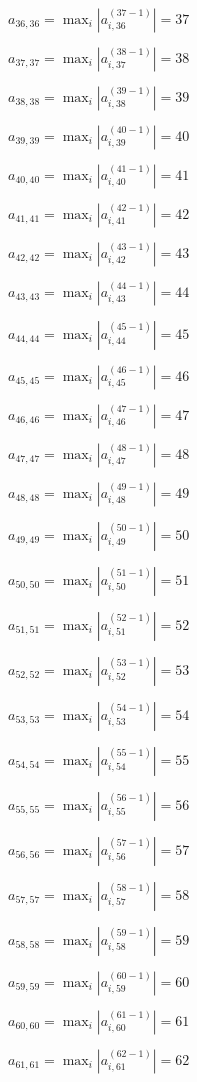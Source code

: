 \documentclass[a4paper,12pt]{article}
\begin{document}
$a _{ 36, 36 } =  \max _i |a _{ i, 36 } ^{ (37 - 1) } | = 37$

$a _{ 37, 37 } =  \max _i |a _{ i, 37 } ^{ (38 - 1) } | = 38$

$a _{ 38, 38 } =  \max _i |a _{ i, 38 } ^{ (39 - 1) } | = 39$

$a _{ 39, 39 } =  \max _i |a _{ i, 39 } ^{ (40 - 1) } | = 40$

$a _{ 40, 40 } =  \max _i |a _{ i, 40 } ^{ (41 - 1) } | = 41$

$a _{ 41, 41 } =  \max _i |a _{ i, 41 } ^{ (42 - 1) } | = 42$

$a _{ 42, 42 } =  \max _i |a _{ i, 42 } ^{ (43 - 1) } | = 43$

$a _{ 43, 43 } =  \max _i |a _{ i, 43 } ^{ (44 - 1) } | = 44$

$a _{ 44, 44 } =  \max _i |a _{ i, 44 } ^{ (45 - 1) } | = 45$

$a _{ 45, 45 } =  \max _i |a _{ i, 45 } ^{ (46 - 1) } | = 46$

$a _{ 46, 46 } =  \max _i |a _{ i, 46 } ^{ (47 - 1) } | = 47$

$a _{ 47, 47 } =  \max _i |a _{ i, 47 } ^{ (48 - 1) } | = 48$

$a _{ 48, 48 } =  \max _i |a _{ i, 48 } ^{ (49 - 1) } | = 49$

$a _{ 49, 49 } =  \max _i |a _{ i, 49 } ^{ (50 - 1) } | = 50$

$a _{ 50, 50 } =  \max _i |a _{ i, 50 } ^{ (51 - 1) } | = 51$

$a _{ 51, 51 } =  \max _i |a _{ i, 51 } ^{ (52 - 1) } | = 52$

$a _{ 52, 52 } =  \max _i |a _{ i, 52 } ^{ (53 - 1) } | = 53$

$a _{ 53, 53 } =  \max _i |a _{ i, 53 } ^{ (54 - 1) } | = 54$

$a _{ 54, 54 } =  \max _i |a _{ i, 54 } ^{ (55 - 1) } | = 55$

$a _{ 55, 55 } =  \max _i |a _{ i, 55 } ^{ (56 - 1) } | = 56$

$a _{ 56, 56 } =  \max _i |a _{ i, 56 } ^{ (57 - 1) } | = 57$

$a _{ 57, 57 } =  \max _i |a _{ i, 57 } ^{ (58 - 1) } | = 58$

$a _{ 58, 58 } =  \max _i |a _{ i, 58 } ^{ (59 - 1) } | = 59$

$a _{ 59, 59 } =  \max _i |a _{ i, 59 } ^{ (60 - 1) } | = 60$

$a _{ 60, 60 } =  \max _i |a _{ i, 60 } ^{ (61 - 1) } | = 61$

$a _{ 61, 61 } =  \max _i |a _{ i, 61 } ^{ (62 - 1) } | = 62$
\end{document}
